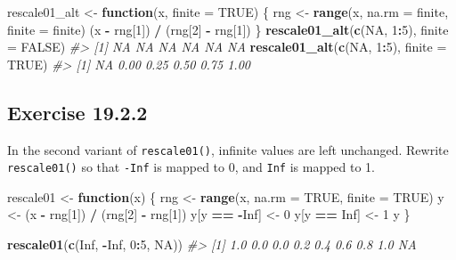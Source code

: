 \documentclass[]{book}
\newenvironment{Shaded}{\begin{snugshade}}{\end{snugshade}}
\newcommand{\CommentTok}[1]{\textcolor[rgb]{0.56,0.35,0.01}{\textit{#1}}}
\newcommand{\ControlFlowTok}[1]{\textcolor[rgb]{0.13,0.29,0.53}{\textbf{#1}}}
\newcommand{\DataTypeTok}[1]{\textcolor[rgb]{0.13,0.29,0.53}{#1}}
\newcommand{\DecValTok}[1]{\textcolor[rgb]{0.00,0.00,0.81}{#1}}
\newcommand{\KeywordTok}[1]{\textcolor[rgb]{0.13,0.29,0.53}{\textbf{#1}}}
\newcommand{\NormalTok}[1]{#1}
\newcommand{\OperatorTok}[1]{\textcolor[rgb]{0.81,0.36,0.00}{\textbf{#1}}}
\newcommand{\OtherTok}[1]{\textcolor[rgb]{0.56,0.35,0.01}{#1}}
\newcommand{\StringTok}[1]{\textcolor[rgb]{0.31,0.60,0.02}{#1}}
\theoremstyle{plain}
\theoremstyle{remark}
\begin{document}
\begin{Shaded}
\begin{Highlighting}[]
\NormalTok{rescale01_alt <-}\StringTok{ }\ControlFlowTok{function}\NormalTok{(x, }\DataTypeTok{finite =} \OtherTok{TRUE}\NormalTok{) \{}
\NormalTok{  rng <-}\StringTok{ }\KeywordTok{range}\NormalTok{(x, }\DataTypeTok{na.rm =}\NormalTok{ finite, }\DataTypeTok{finite =}\NormalTok{ finite)}
\NormalTok{  (x }\OperatorTok{-}\StringTok{ }\NormalTok{rng[}\DecValTok{1}\NormalTok{]) }\OperatorTok{/}\StringTok{ }\NormalTok{(rng[}\DecValTok{2}\NormalTok{] }\OperatorTok{-}\StringTok{ }\NormalTok{rng[}\DecValTok{1}\NormalTok{])}
\NormalTok{\}}
\KeywordTok{rescale01_alt}\NormalTok{(}\KeywordTok{c}\NormalTok{(}\OtherTok{NA}\NormalTok{, }\DecValTok{1}\OperatorTok{:}\DecValTok{5}\NormalTok{), }\DataTypeTok{finite =} \OtherTok{FALSE}\NormalTok{)}
\CommentTok{#> [1] NA NA NA NA NA NA}
\KeywordTok{rescale01_alt}\NormalTok{(}\KeywordTok{c}\NormalTok{(}\OtherTok{NA}\NormalTok{, }\DecValTok{1}\OperatorTok{:}\DecValTok{5}\NormalTok{), }\DataTypeTok{finite =} \OtherTok{TRUE}\NormalTok{)}
\CommentTok{#> [1]   NA 0.00 0.25 0.50 0.75 1.00}
\end{Highlighting}
\end{Shaded}

\hypertarget{exercise-19.2.2}{%
\subsection*{\texorpdfstring{Exercise
{19.2.2}}{Exercise 19.2.2}}\label{exercise-19.2.2}}

In the second variant of \texttt{rescale01()}, infinite values are left
unchanged. Rewrite \texttt{rescale01()} so that \texttt{-Inf} is mapped
to 0, and \texttt{Inf} is mapped to 1.

\begin{Shaded}
\begin{Highlighting}[]
\NormalTok{rescale01 <-}\StringTok{ }\ControlFlowTok{function}\NormalTok{(x) \{}
\NormalTok{  rng <-}\StringTok{ }\KeywordTok{range}\NormalTok{(x, }\DataTypeTok{na.rm =} \OtherTok{TRUE}\NormalTok{, }\DataTypeTok{finite =} \OtherTok{TRUE}\NormalTok{)}
\NormalTok{  y <-}\StringTok{ }\NormalTok{(x }\OperatorTok{-}\StringTok{ }\NormalTok{rng[}\DecValTok{1}\NormalTok{]) }\OperatorTok{/}\StringTok{ }\NormalTok{(rng[}\DecValTok{2}\NormalTok{] }\OperatorTok{-}\StringTok{ }\NormalTok{rng[}\DecValTok{1}\NormalTok{])}
\NormalTok{  y[y }\OperatorTok{==}\StringTok{ }\OperatorTok{-}\OtherTok{Inf}\NormalTok{] <-}\StringTok{ }\DecValTok{0}
\NormalTok{  y[y }\OperatorTok{==}\StringTok{ }\OtherTok{Inf}\NormalTok{] <-}\StringTok{ }\DecValTok{1}
\NormalTok{  y}
\NormalTok{\}}

\KeywordTok{rescale01}\NormalTok{(}\KeywordTok{c}\NormalTok{(}\OtherTok{Inf}\NormalTok{, }\OperatorTok{-}\OtherTok{Inf}\NormalTok{, }\DecValTok{0}\OperatorTok{:}\DecValTok{5}\NormalTok{, }\OtherTok{NA}\NormalTok{))}
\CommentTok{#> [1] 1.0 0.0 0.0 0.2 0.4 0.6 0.8 1.0  NA}
\end{Highlighting}
\end{Shaded}
\end{document}
